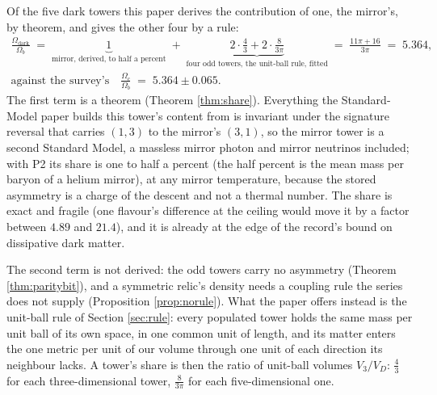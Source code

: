 \documentclass[11pt]{article}
\theoremstyle{definition}
\begin{document}
Of the five dark towers this paper derives the contribution of one, the mirror's, by theorem, and gives the other four by a rule:
\begin{gather*}
\frac{\Omega_{\mathrm{dark}}}{\Omega_{b}} \;=\; \underbrace{1}_{\text{mirror, derived, to half a percent}} \;+\; \underbrace{2 \cdot \frac{4}{3} + 2 \cdot \frac{8}{3\pi}}_{\text{four odd towers, the unit-ball rule, fitted}} \;=\; \frac{11\pi + 16}{3\pi} \;=\; 5.364,\\[6pt]
\text{against the survey's}\quad
\frac{\Omega_{c}}{\Omega_{b}} \;=\; 5.364 \pm 0.065.
\end{gather*}
The first term is a theorem (Theorem \ref{thm:share}). Everything the Standard-Model paper builds this tower's content from is invariant under the signature reversal that carries $(1,3)$ to the mirror's $(3,1)$, so the mirror tower is a second Standard Model, a massless mirror photon and mirror neutrinos included; with P2 its share is one to half a percent (the half percent is the mean mass per baryon of a helium mirror), at any mirror temperature, because the stored asymmetry is a charge of the descent and not a thermal number. The share is exact and fragile (one flavour's difference at the ceiling would move it by a factor between $4.89$ and $21.4$), and it is already at the edge of the record's bound on dissipative dark matter.

The second term is not derived: the odd towers carry no asymmetry (Theorem \ref{thm:paritybit}), and a symmetric relic's density needs a coupling rule the series does not supply (Proposition \ref{prop:norule}). What the paper offers instead is the unit-ball rule of Section \ref{sec:rule}: every populated tower holds the same mass per unit ball of its own space, in one common unit of length, and its matter enters the one metric per unit of our volume through one unit of each direction its neighbour lacks. A tower's share is then the ratio of unit-ball volumes $V_{3}/V_{D}$: $\tfrac{4}{3}$ for each three-dimensional tower, $\tfrac{8}{3\pi}$ for each five-dimensional one.
\end{document}
